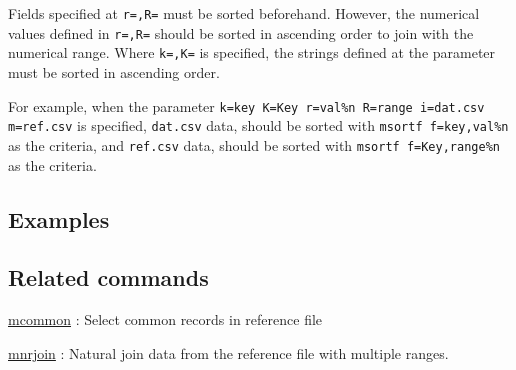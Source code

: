 Fields specified at \verb|r=,R=| must be sorted beforehand. 
However, the numerical values defined in \verb|r=,R=| should be sorted in ascending order to join with the numerical range. 
Where \verb|k=,K=| is specified, the strings defined at the parameter must be sorted in ascending order. 

For example, when the parameter \verb|k=key K=Key r=val%n R=range i=dat.csv m=ref.csv| is specified, \verb|dat.csv| data, should be sorted with \verb|msortf f=key,val%n| as the criteria, and \verb|ref.csv| data, should be sorted with \verb|msortf f=Key,range%n| as the criteria. 

\subsection*{Examples}


\subsection*{Related commands}
\hyperref[sect:mcommon] {mcommon} : Select common records in reference file

\hyperref[sect:mnrjoin] {mnrjoin} : Natural join data from the reference file with multiple ranges. 



%
